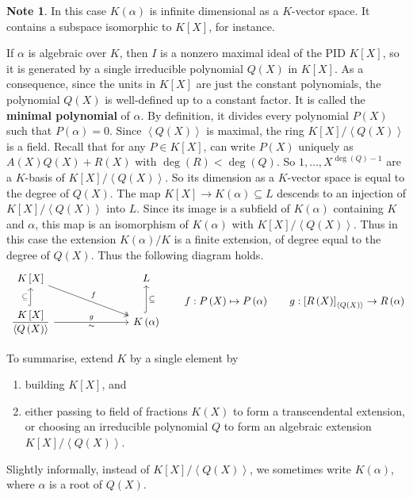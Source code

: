 \documentclass{article}
\newcommand{\rb}[1]{\left( #1 \right)}
\renewcommand{\sb}[1]{\left[ #1 \right]}
\newcommand{\ab}[1]{\left\langle #1 \right\rangle}
\theoremstyle{definition}\newtheorem{definition}{Definition}[subsection]
\theoremstyle{definition}\newtheorem{remark}[definition]{Remark}
\theoremstyle{definition}\newtheorem*{example}{Example}
\theoremstyle{definition}\newtheorem*{note}{Note}
\begin{document}
\begin{note}
In this case $ K\rb{\alpha} $ is infinite dimensional as a $ K $-vector space. It contains a subspace isomorphic to $ K\sb{X} $, for instance.
\end{note}

If $ \alpha $ is algebraic over $ K $, then $ I $ is a nonzero maximal ideal of the PID $ K\sb{X} $, so it is generated by a single irreducible polynomial $ Q\rb{X} $ in $ K\sb{X} $. As a consequence, since the units in $ K\sb{X} $ are just the constant polynomials, the polynomial $ Q\rb{X} $ is well-defined up to a constant factor. It is called the \textbf{minimal polynomial} of $ \alpha $. By definition, it divides every polynomial $ P\rb{X} $ such that $ P\rb{\alpha} = 0 $. Since $ \ab{Q\rb{X}} $ is maximal, the ring $ K\sb{X} / \ab{Q\rb{X}} $ is a field. Recall that for any $ P \in K\sb{X} $, can write $ P\rb{X} $ uniquely as $ A\rb{X}Q\rb{X} + R\rb{X} $ with $ \deg\rb{R} < \deg\rb{Q} $. So $ 1, \dots, X^{\deg\rb{Q} - 1} $ are a $ K $-basis of $ K\sb{X} / \ab{Q\rb{X}} $. So its dimension as a $ K $-vector space is equal to the degree of $ Q\rb{X} $. The map $ K\sb{X} \to K\rb{\alpha} \subseteq L $ descends to an injection of $ K\sb{X} / \ab{Q\rb{X}} $ into $ L $. Since its image is a subfield of $ K\rb{\alpha} $ containing $ K $ and $ \alpha $, this map is an isomorphism of $ K\rb{\alpha} $ with $ K\sb{X} / \ab{Q\rb{X}} $. Thus in this case the extension $ K\rb{\alpha} / K $ is a finite extension, of degree equal to the degree of $ Q\rb{X} $. Thus the following diagram holds.
$$
\begin{tikzcd}[column sep=1in]
K\sb{X} \arrow[twoheadrightarrow]{dr}{f} & L \\
\dfrac{K\sb{X}}{\ab{Q\rb{X}}} \arrow[hookrightarrow]{u}{\subseteq} \arrow{r}{g}[swap]{\sim} & K\rb{\alpha} \arrow[hookrightarrow, swap]{u}{\subseteq}
\end{tikzcd}
\qquad f : P\rb{X} \mapsto P\rb{\alpha} \qquad g : \sb{R\rb{X}}_{\ab{Q\rb{X}}} \to R\rb{\alpha}
$$

To summarise, extend $ K $ by a single element by
\begin{enumerate}
\item building $ K\sb{X} $, and
\item either passing to field of fractions $ K\rb{X} $ to form a transcendental extension, or choosing an irreducible polynomial $ Q $ to form an algebraic extension $ K\sb{X} / \ab{Q\rb{X}} $.
\end{enumerate}
Slightly informally, instead of $ K\sb{X} / \ab{Q\rb{X}} $, we sometimes write $ K\rb{\alpha} $, where $ \alpha $ is a root of $ Q\rb{X} $.
\end{document}
